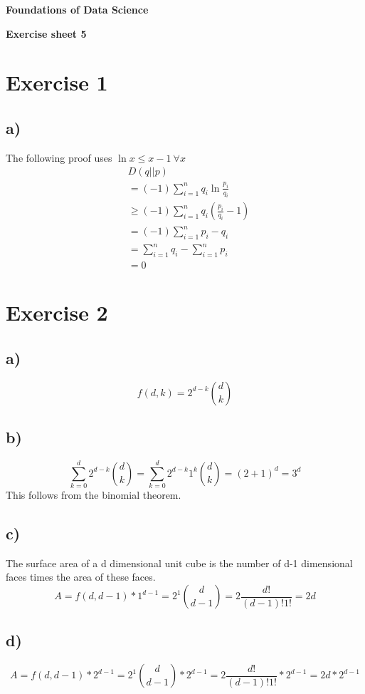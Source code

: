 \documentclass[a4paper,10pt]{article}
\begin{document}
\centerline{\Large\bfseries  Foundations of Data Science }
\centerline{\bfseries  Exercise sheet 5}
\section*{Exercise 1}
\subsection*{a)}
The following proof uses  $\ln x \leq x-1 \ \forall x$\\
\begin{align*}
&D(q||p) \\
&= (-1) \sum\limits_{i=1}^n q_i \ln \frac{p_i}{q_i} \\
&\geq (-1) \sum\limits_{i=1}^n q_i  (\frac{p_i}{q_i}-1)\\
&= (-1) \sum\limits_{i=1}^n p_i-q_i\\
&= \sum\limits_{i=1}^n q_i - \sum\limits_{i=1}^n p_i\\
&=0
\end{align*}


\section*{Exercise 2}
\subsection*{a)}
\[f(d,k)= 2^{d-k} {{d}\choose{k}}\]
\subsection*{b)}
\[\sum_{k=0}^d 2^{d-k} {{d}\choose{k}} =\sum_{k=0}^d 2^{d-k} 1^k {{d}\choose{k}}= (2+1)^d=3^d \]
This follows from the binomial theorem. 
\subsection*{c)}
The surface area of a d dimensional unit cube is the number of d-1 dimensional faces times the area of these faces. 
\[A=f(d,d-1)*1^{d-1}=2^1 {{d} \choose {d-1}}= 2 \frac{d!}{(d-1)!1!}=2d\] 
\subsection*{d)}
\[A=f(d,d-1)*2^{d-1}=2^1 {{d} \choose {d-1}}*2^{d-1}= 2 \frac{d!}{(d-1)!1!}*2^{d-1}=2d*2^{d-1}\]
\end{document}

